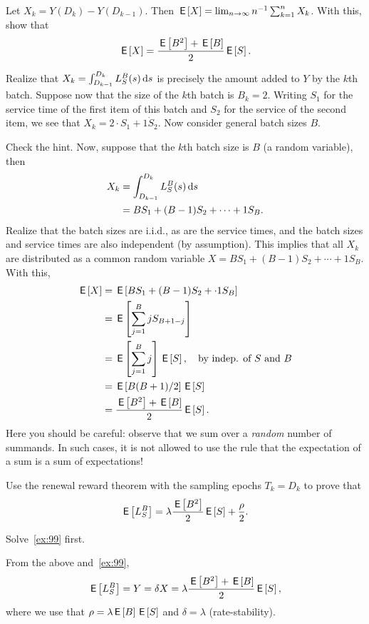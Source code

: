 \begin{extra}\label{ex:99}
Let $X_k = Y(D_k)-Y(D_{k-1})$. Then $\,\mathsf{E}\left[X\right] = \lim_{n\to\infty} n^{-1} \sum_{k=1}^n X_k$. With this, show that
\begin{equation*}
  \,\mathsf{E}\left[X\right] = \frac{\,\mathsf{E}\left[B^2\right]+\,\mathsf{E}\left[B\right]}2 \,\mathsf{E}\left[S\right].
\end{equation*}
\begin{hint}
  Realize that $X_k = \int_{D_{k-1}}^{D_k} L_S^B(s) \,\text{d}s$ is precisely the amount added to $Y$ by the $k$th batch.
  Suppose now that the size of the $k$th batch is $B_k = 2$.
  Writing $S_1$ for the service time of the first item of this batch and $S_2$ for the service of the second item, we see that $X_k = 2\cdot S_1 + 1\dot S_2$.
  Now consider general batch sizes $B$.
\end{hint}
\begin{solution}
  Check the hint. Now, suppose that the $k$th batch size is $B$ (a random variable), then
  \begin{align*}
    X_k &= \int_{D_{k-1}}^{D_k} L_S^B(s) \,\text{d}s \\
    &= B S_1 + (B-1)S_2 + \cdots + 1 S_B.
  \end{align*}
  Realize that the batch sizes are i.i.d., as are the service times, and the batch sizes and service times are also independent (by assumption).
  This implies that all $X_k$ are distributed as a common random variable $X= B S_1 + (B-1)S_2 + \cdots + 1 S_B$.
  With this,
  \begin{align*}
    \,\mathsf{E}\left[X\right] & = \,\mathsf{E}\left[B S_1 + (B-1)S_2 + \cdot 1 S_B\right]\\
    &= \,\mathsf{E}\left[\sum_{j=1}^B j S_{B+1-j}\right] \\
    &= \,\mathsf{E}\left[\sum_{j=1}^B j\right] \,\mathsf{E}\left[S\right], \quad\text{by indep. of $S$ and $B$} \\
    &= \,\mathsf{E}\left[B(B+1)/2\right] \,\mathsf{E}\left[S\right] \\
    &= \frac{\,\mathsf{E}\left[B^2\right]+\,\mathsf{E}\left[B\right]}2 \,\mathsf{E}\left[S\right].
  \end{align*}
  Here you should be careful: observe that we sum over a \emph{random} number of summands.
  In such cases, it is not allowed to use the rule that the expectation of a sum is a sum of expectations!
\end{solution}
\end{extra}


\begin{exercise}\label{ex:100}
Use the renewal reward theorem with the sampling epochs $T_k = D_k$ to prove that
\begin{equation*}
  \,\mathsf{E}\left[L_S^B\right] = \lambda \frac{\,\mathsf{E}\left[B^2\right]}2\,\mathsf{E}\left[S\right] + \frac\rho 2.
\end{equation*}
\begin{hint}
  Solve~\cref{ex:99} first. 
\end{hint}
\begin{solution}
  From the above and~\cref{ex:99},
  \begin{equation*}
    \,\mathsf{E}\left[L_S^B\right] = Y = \delta X = \lambda \frac{\,\mathsf{E}\left[B^2\right]+\,\mathsf{E}\left[B\right]}2 \,\mathsf{E}\left[S\right],
  \end{equation*}
where we use that $\rho = \lambda \,\mathsf{E}\left[B\right] \,\mathsf{E}\left[S\right]$ and $\delta = \lambda$ (rate-stability).
\end{solution}
\end{exercise}



